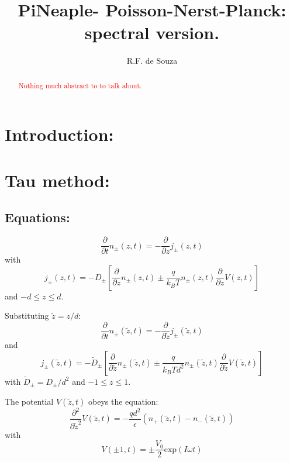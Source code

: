\documentclass[amsmath,amsfonts,amssymb,superscriptaddress,showkeys,notitlepage,onecolumn]{revtex4-1}
\newcommand{\tred}[1]{ \textcolor{red}{#1} }
\newcommand{\dpartial}[1]{\ensuremath{\dfrac{\partial}{\partial #1}}}
\newcommand{\ddpartial}[1]{\ensuremath{\dfrac{\partial^2}{\partial #1^2}}}
\newcommand{\Npm}{\ensuremath{n_{\pm}(z,t)}}
\newcommand{\Np}{\ensuremath{n_{+}(\tilde{z},t)}}
\newcommand{\Nm}{\ensuremath{n_{-}(\tilde{z},t)}}
\newcommand{\jpm}{\ensuremath{j_{\pm}(z,t)}}
\begin{document}
\title{PiNeaple- Poisson-Nerst-Planck: spectral version.}

\author{R.F. de Souza}

\begin{abstract} \tred{ Nothing much abstract to to talk about.} 
\end{abstract}

\maketitle

\section{Introduction:}



\section{Tau method:}

\subsection{Equations:}
\begin{equation}
  \dfrac{\partial}{\partial t}\Npm= -\dpartial{z} \jpm
\end{equation}
with
\begin{equation}\label{eq:StrongFlux}
  j_{\pm}(z,t)=-D_{\pm}\left[\dpartial{z} \Npm \pm \dfrac{q}{k_B T} \Npm \dpartial{z} V(z,t) \right] 
\end{equation}
and $-d \leq z \leq d$.

  \renewcommand{\Npm}{\ensuremath{n_{\pm}(\tilde{z},t)}}
  \renewcommand{\jpm}{\ensuremath{j_{\pm}(\tilde{z},t)}}

  
  Substituting $\tilde{z}=z/d$:
  \begin{equation}\label{eq:StrongPotential}
  \dfrac{\partial}{\partial t}\Npm= -\dpartial{\tilde{z}} \jpm
\end{equation}
and  
\begin{equation}
  \jpm=-\tilde{D}_\pm\left[\dpartial{\tilde{z}}\Npm \pm \dfrac{q}{k_B T d^2} \Npm \dpartial{\tilde{z}} V(\tilde{z},t) \right]
\end{equation}
with $\tilde{D}_\pm =D_\pm/d^2$ and $-1\leq z \leq 1$.

The potential $V(\tilde{z},t)$ obeys the equation:
\begin{equation}
  \ddpartial{\tilde{z}} V(\tilde{z},t) =-\dfrac{q d^2}{\epsilon}(\Np-\Nm)
\end{equation}
with
\begin{equation}
  V\left(\pm 1 ,t \right)=\pm \dfrac{V_0}{2} \text{exp}(I \omega t)
\end{equation}
\end{document}
